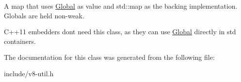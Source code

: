 A map that uses \hyperlink{classv8_1_1_global}{Global} as value and std\+::map as the backing implementation. Globals are held non-\/weak.

C++11 embedders don\textquotesingle{}t need this class, as they can use \hyperlink{classv8_1_1_global}{Global} directly in std containers. 

The documentation for this class was generated from the following file\+:\begin{DoxyCompactItemize}
\item 
include/v8-\/util.\+h\end{DoxyCompactItemize}
